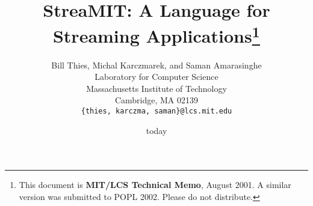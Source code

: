 \documentclass[psfig]{acm_proc_article-sp}
\begin{document}
\title{StreaMIT: A Language for Streaming Applications\thanks{This
document is {\bf MIT/LCS Technical Memo}, August 2001.  A similar
version was submitted to POPL 2002.  Please do not distribute.}}

\author{
\alignauthor Bill Thies, Michal Karczmarek, and Saman Amarasinghe\\
	\vspace{12pt}
	Laboratory for Computer Science \\
	Massachusetts Institute of Technology \\
	Cambridge, MA  02139 \\
	\vspace{12pt}
	{\tt \{thies, karczma, saman\}@lcs.mit.edu}
}

\date{today}

\newcommand{\ma}[2]{max_{#1 \rightarrow #2}}
\newcommand{\mal}[1]{maxloop_{#1 \rightarrow #1}}
\newcommand{\mi}[2]{min_{#1 \leftarrow #2}}

\maketitle

\begin{abstract}

\end{abstract}












\end{document}
